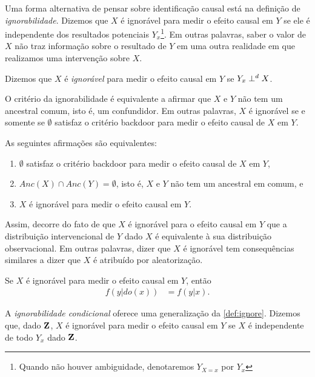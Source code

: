 Uma forma alternativa de pensar sobre
identificação causal está
na definição de \textit{ignorabilidade}.
Dizemos que $X$ é ignorável para
medir o efeito causal em $Y$ se
ele é independente dos resultados potenciais $Y_{x}$\footnote{
Quando não houver ambiguidade, denotaremos $Y_{X=x}$ por $Y_x$}.
Em outras palavras, 
saber o valor de $X$ não traz informação sobre
o resultado de $Y$ em uma outra realidade em que
realizamos uma intervenção sobre $X$.

\begin{definition}[Ignorabilidade]
 \label{def:ignore}
 Dizemos que $X$ é \textit{ignorável} para
 medir o efeito causal em $Y$ se
 $Y_x \perp^d X$.
\end{definition}

O critério da ignorabilidade é equivalente a
afirmar que $X$ e $Y$ não tem um ancestral comum, 
isto é, um confundidor.
Em outras palavras, $X$ é ignorável se
e somente se $\emptyset$ satisfaz o critério backdoor para
medir o efeito causal de $X$ em $Y$.

\begin{lemma}
 \label{lemma:ignore_backdoor}
 As seguintes afirmações são equivalentes:
 \begin{enumerate}
  \item $\emptyset$ satisfaz o critério backdoor para
  medir o efeito causal de $X$ em $Y$,
  \item $Anc(X) \cap Anc(Y) = \emptyset$, isto é,
  $X$ e $Y$ não tem um ancestral em comum, e
  \item $X$ é ignorável para medir o efeito causal em $Y$.
 \end{enumerate}
\end{lemma}

Assim, decorre do fato de que $X$ é ignorável para 
o efeito causal em $Y$ que
a distribuição intervencional de $Y$ dado $X$ é
equivalente à sua distribuição observacional.
Em outras palavras, dizer que $X$ é ignorável tem
consequências similares a dizer que
$X$ é atribuído por aleatorização.

\begin{corollary}
 \label{cor:ignore}
 Se $X$ é ignorável para medir o efeito causal em $Y$, então
 \begin{align*}
  f(y|do(x)) &= f(y|x).
 \end{align*}
\end{corollary}

A \textit{ignorabilidade condicional} oferece
uma generalização da \cref{def:ignore}.
Dizemos que, dado ${\mathbf{Z}}$, 
$X$ é ignorável para medir o efeito causal em $Y$ se
$X$ é independente de todo $Y_x$ dado ${\mathbf{Z}}$.

